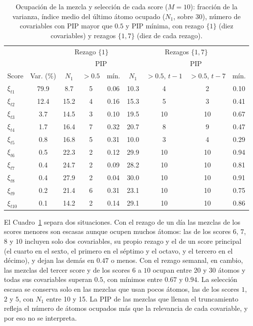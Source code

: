 \begin{table}[H]
\centering\small
\setlength{\tabcolsep}{4pt}
\caption{Ocupación de la mezcla y selección de cada score ($M = 10$): fracción de la varianza, índice medio del último átomo ocupado ($N_1$, sobre 30), número de covariables con PIP mayor que $0.5$ y PIP mínima, con rezago $\{1\}$ (diez covariables) y rezagos $\{1,7\}$ (diez de cada rezago).}
\label{tab:aneC_pip}
\begin{tabular}{l c ccc cccc}
\hline
 & & \multicolumn{3}{c}{Rezago $\{1\}$} & \multicolumn{4}{c}{Rezagos $\{1,7\}$} \\
 & & & \multicolumn{2}{c}{PIP} & & \multicolumn{3}{c}{PIP} \\
Score & Var. (\%) & $N_1$ & $> 0.5$ & mín. & $N_1$ & $> 0.5$, $t-1$ & $> 0.5$, $t-7$ & mín. \\
\hline
$\xi_{t1}$  & 79.9 & 8.7  & 5 & 0.06 & 10.3 & 4  & 2  & 0.10 \\
$\xi_{t2}$  & 12.4 & 15.2 & 4 & 0.16 & 15.3 & 5  & 3  & 0.41 \\
$\xi_{t3}$  & 3.7  & 14.5 & 3 & 0.10 & 19.5 & 10 & 10 & 0.67 \\
$\xi_{t4}$  & 1.7  & 16.4 & 7 & 0.32 & 20.7 & 8  & 9  & 0.47 \\
$\xi_{t5}$  & 0.8  & 16.8 & 5 & 0.31 & 10.0 & 3  & 4  & 0.29 \\
$\xi_{t6}$  & 0.5  & 22.3 & 2 & 0.12 & 29.9 & 10 & 10 & 0.94 \\
$\xi_{t7}$  & 0.4  & 24.7 & 2 & 0.09 & 28.2 & 10 & 10 & 0.81 \\
$\xi_{t8}$  & 0.4  & 27.9 & 2 & 0.04 & 30.0 & 10 & 10 & 0.91 \\
$\xi_{t9}$  & 0.2  & 21.4 & 6 & 0.31 & 23.1 & 10 & 10 & 0.75 \\
$\xi_{t10}$ & 0.1  & 14.2 & 2 & 0.14 & 29.1 & 10 & 10 & 0.86 \\
\hline
\end{tabular}
\end{table}

El Cuadro~\ref{tab:aneC_pip} separa dos situaciones. Con el rezago de un día las mezclas de los scores menores son escasas aunque ocupen muchos átomos: las de los scores $6$, $7$, $8$ y $10$ incluyen solo dos covariables, su propio rezago y el de un score principal (el cuarto en el sexto, el primero en el séptimo y el octavo, y el tercero en el décimo), y dejan las demás en $0.47$ o menos. Con el rezago semanal, en cambio, las mezclas del tercer score y de los scores $6$ a $10$ ocupan entre 20 y 30 átomos y todas sus covariables superan $0.5$, con mínimos entre $0.67$ y $0.94$. La selección escasa se conserva solo en las mezclas que usan pocos átomos, las de los scores $1$, $2$ y $5$, con $N_1$ entre 10 y 15. La PIP de las mezclas que llenan el truncamiento refleja el número de átomos ocupados más que la relevancia de cada covariable, y por eso no se interpreta.
